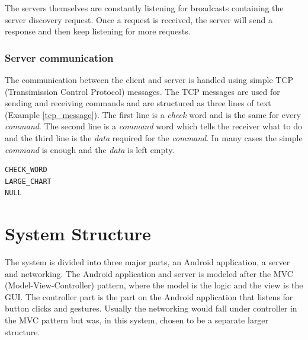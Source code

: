 \documentclass[12pt,a4paper,notitlepage]{report}
\begin{document}
The servers themselves are constantly listening for broadcasts containing the server discovery request. Once a request is received, the server will send a response and then keep listening for more requests.

\subsubsection{Server communication}
The communication between the client and server is handled using simple TCP (Transimission Control Protocol) messages. The TCP messages are used for sending and receiving commands and are structured as three lines of text (Example \ref{tcp_message}). The first line is a \textit{check} word and is the same for every \textit{command}. The second line is a \textit{command} word which tells the receiver what to do and the third line is the \textit{data} required for the \textit{command}. In many cases the simple \textit{command} is enough and the \textit{data} is left empty.

\begin{center}
\renewcommand{\lstlistingname}{Example}
  \lstset{%
    title=Example of TCP message,
    basicstyle=\ttfamily\footnotesize\bfseries,
    xleftmargin=.2\textwidth, xrightmargin=.2\textwidth
  }
\begin{lstlisting}[caption=TCP Message, label=tcp_message]
CHECK_WORD
LARGE_CHART
NULL
\end{lstlisting}
\end{center}


\section{System Structure}
The system is divided into three major parts, an Android application, a server and networking. The Android application and server is modeled after the MVC (Model-View-Controller) pattern, where the model is the logic and the view is the GUI. The controller part is the part on the Android application that listens for button clicks and gestures. Usually the networking would fall under controller in the MVC pattern but was, in this system, chosen to be a separate larger structure.
\end{document}
